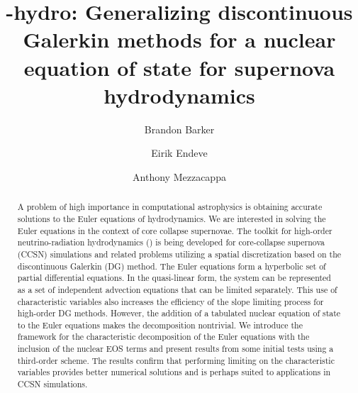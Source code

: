 \documentclass[onecolumn]{aastex62}
\begin{document}
\title{\thornado-hydro: Generalizing discontinuous Galerkin methods for a nuclear
equation of state for supernova hydrodynamics}
\author{Brandon Barker}

\author{Eirik Endeve}

\author{Anthony Mezzacappa}


\begin{abstract}
A problem of high importance in computational astrophysics is obtaining accurate
solutions to the Euler equations of hydrodynamics. We are interested in solving
the Euler equations in the context of core collapse supernovae.
The toolkit for high-order neutrino-radiation hydrodynamics (\thornado)
is being developed for core-collapse supernova (CCSN) simulations and related problems utilizing a spatial discretization
based on the discontinuous Galerkin (DG) method.
The Euler equations form a hyperbolic set of partial differential equations.
In the quasi-linear form, the system can be represented
as a set of independent advection equations that can be limited separately.
This use of characteristic variables also increases the efficiency of the slope
limiting process for high-order DG methods. However, the addition of a
tabulated nuclear equation of state to the Euler equations makes the decomposition nontrivial.
We introduce the framework for the characteristic decomposition of the Euler equations
with the inclusion of the nuclear EOS terms and
present results from some initial tests using a third-order scheme.
The results confirm that performing limiting
on the characteristic variables provides better numerical solutions and is perhaps
suited to applications in CCSN simulations.
\end{abstract}

\end{document}
